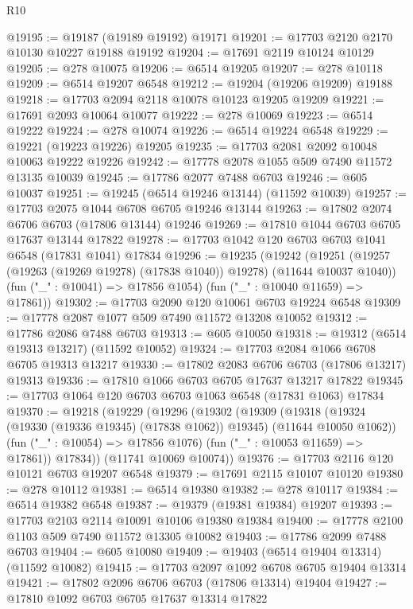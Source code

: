 \begin{lexlean}{R10}
\begin{coremodule}
{{{{{{{{{{{{{{{{{{{{{{{{{{{{{{{{{{{{{{{{{{{{{{{{{{{{{{{{{{{{{{{{{{{{{{{{{{{{{{{{{{{{@19195 := @19187 (@19189 @19192) @19171
@19201 := @17703 @2120 @2170 @10130 @10227 @19188 @19192
@19204 := @17691 @2119 @10124 @10129
@19205 := @278 @10075
@19206 := @6514 @19205
@19207 := @278 @10118
@19209 := @6514 @19207 @6548
@19212 := @19204 (@19206 @19209) @19188
@19218 := @17703 @2094 @2118 @10078 @10123 @19205 @19209
@19221 := @17691 @2093 @10064 @10077
@19222 := @278 @10069
@19223 := @6514 @19222
@19224 := @278 @10074
@19226 := @6514 @19224 @6548
@19229 := @19221 (@19223 @19226) @19205
@19235 := @17703 @2081 @2092 @10048 @10063 @19222 @19226
@19242 := @17778 @2078 @1055 @509 @7490 @11572 @13135 @10039
@19245 := @17786 @2077 @7488 @6703
@19246 := @605 @10037
@19251 := @19245 (@6514 @19246 @13144) (@11592 @10039)
@19257 := @17703 @2075 @1044 @6708 @6705 @19246 @13144
@19263 := @17802 @2074 @6706 @6703 (@17806 @13144) @19246
@19269 := @17810 @1044 @6703 @6705 @17637 @13144 @17822
@19278 := @17703 @1042 @120 @6703 @6703 @1041 @6548 (@17831 @1041) @17834
@19296 := @19235
    (@19242
      (@19251 (@19257 (@19263 (@19269 @19278) (@17838 @1040)) @19278) (@11644 @10037 @1040))
      (fun ("_" : @10041) => @17856 @1054)
      (fun ("_" : @10040 @11659) => @17861))
@19302 := @17703 @2090 @120 @10061 @6703 @19224 @6548
@19309 := @17778 @2087 @1077 @509 @7490 @11572 @13208 @10052
@19312 := @17786 @2086 @7488 @6703
@19313 := @605 @10050
@19318 := @19312 (@6514 @19313 @13217) (@11592 @10052)
@19324 := @17703 @2084 @1066 @6708 @6705 @19313 @13217
@19330 := @17802 @2083 @6706 @6703 (@17806 @13217) @19313
@19336 := @17810 @1066 @6703 @6705 @17637 @13217 @17822
@19345 := @17703 @1064 @120 @6703 @6703 @1063 @6548 (@17831 @1063) @17834
@19370 := @19218
    (@19229
      (@19296
        (@19302
          (@19309
            (@19318 (@19324 (@19330 (@19336 @19345) (@17838 @1062)) @19345) (@11644 @10050 @1062))
            (fun ("_" : @10054) => @17856 @1076)
            (fun ("_" : @10053 @11659) => @17861))
          @17834))
      (@11741 @10069 @10074))
@19376 := @17703 @2116 @120 @10121 @6703 @19207 @6548
@19379 := @17691 @2115 @10107 @10120
@19380 := @278 @10112
@19381 := @6514 @19380
@19382 := @278 @10117
@19384 := @6514 @19382 @6548
@19387 := @19379 (@19381 @19384) @19207
@19393 := @17703 @2103 @2114 @10091 @10106 @19380 @19384
@19400 := @17778 @2100 @1103 @509 @7490 @11572 @13305 @10082
@19403 := @17786 @2099 @7488 @6703
@19404 := @605 @10080
@19409 := @19403 (@6514 @19404 @13314) (@11592 @10082)
@19415 := @17703 @2097 @1092 @6708 @6705 @19404 @13314
@19421 := @17802 @2096 @6706 @6703 (@17806 @13314) @19404
@19427 := @17810 @1092 @6703 @6705 @17637 @13314 @17822
}}}}}}}}}}}}}}}}}}}}}}}}}}}}}}}}}}}}}}}}}}}}}}}}}}}}}}}}}}}}}}}}}}}}}}}}}}}}}}}}}}}}
\end{coremodule}
\end{lexlean}

